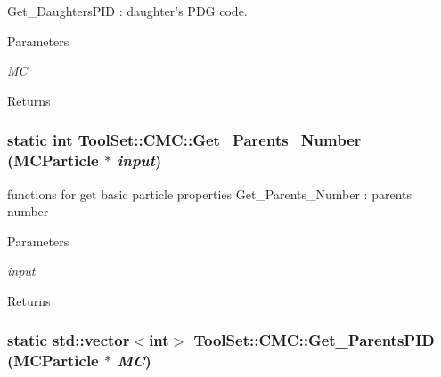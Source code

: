 Get\_\-DaughtersPID : daughter's PDG code. 
\begin{DoxyParams}{Parameters}
\item[{\em MC}]\end{DoxyParams}
\begin{DoxyReturn}{Returns}

\end{DoxyReturn}
\hypertarget{classToolSet_1_1CMC_a67ab1d51b7fd0f98cfa19be5381e961a}{
\subsubsection[{Get\_\-Parents\_\-Number}]{\setlength{\rightskip}{0pt plus 5cm}static int ToolSet::CMC::Get\_\-Parents\_\-Number (MCParticle $\ast$ {\em input})}}
\label{classToolSet_1_1CMC_a67ab1d51b7fd0f98cfa19be5381e961a}


functions for get basic particle properties Get\_\-Parents\_\-Number : parents number 
\begin{DoxyParams}{Parameters}
\item[{\em input}]\end{DoxyParams}
\begin{DoxyReturn}{Returns}

\end{DoxyReturn}
\hypertarget{classToolSet_1_1CMC_aa98186321fc75d5f476bc97511e1d91b}{
\subsubsection[{Get\_\-ParentsPID}]{\setlength{\rightskip}{0pt plus 5cm}static std::vector$<$int$>$ ToolSet::CMC::Get\_\-ParentsPID (MCParticle $\ast$ {\em MC})}}
\label{classToolSet_1_1CMC_aa98186321fc75d5f476bc97511e1d91b}


